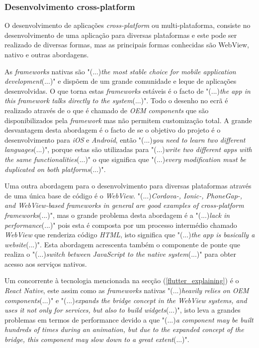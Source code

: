 \subsubsection{Desenvolvimento cross-platform}
O desenvolvimento de aplicações \textit{cross-platform} ou multi-plataforma, consiste no desenvolvimento de uma aplicação para diversas plataformas e este pode ser realizado de diversas formas, mas as principais formas conhecidas são WebView, nativo e outras abordagens.

As \emph{frameworks} nativas são "(...)\emph{the most stable choice for mobile application development}(...)"\citep{flutter} e dispõem de um grande comunidade e leque de aplicações desenvolvidas. O que torna estas \textit{frameworks} estáveis é o facto de "(...)\emph{the app in this framework talks directly to the system}(...)"\citep{flutter}. Todo o desenho no ecrã é realizado através de o que é chamado de \emph{OEM components} que são disponibilizados pela \emph{framework} mas não permitem customização total. A grande desvantagem desta abordagem é o facto de se o objetivo do projeto é o desenvolvimento para \textit{iOS} e \textit{Android}, então "(...)\emph{you need to learn two different languages}(...)"\citep{flutter}, porque estas são utilizadas para "(...)\emph{write two different apps with the same functionalities}(...)"\citep{flutter} o que significa que "(...)\emph{every modification must be duplicated on both platforms}(...)"\citep{flutter}.

Uma outra abordagem para o desenvolvimento para diversas plataformas através de uma única base de código é o \textit{WebView}. "(...)\emph{Cordova-, Ionic-, PhoneGap-, and WebView-based frameworks in general are good examples of cross-platform frameworks}(...)"\citep{flutter}, mas o grande problema desta abordagem é a "(...)\emph{lack in performance}(...)"\citep{flutter} pois esta é composta por um processo intermédio chamado \textit{WebView} que renderiza código \textit{HTML}, isto significa que "(...)\emph{the app is basically a website}(...)"\citep{flutter}.
Esta abordagem acrescenta também o componente de ponte que realiza o "(...)\emph{switch between JavaScript to the native system}(...)"\citep{flutter} para obter acesso aos serviços nativos.

Um concorrente à tecnologia mencionada na secção (\ref{flutter_explaining}) é o \textit{React Native}, este assim como as \textit{frameworks} nativas "(...)\emph{heavily relies on OEM components}(...)"\citep{flutter} e "(...)\emph{expands the bridge concept in the WebView systems, and uses it not only for services, but also to build widgets}(...)"\citep{flutter}, isto leva a grandes problemas em termos de performance devido a que "(...)\emph{a component may be built hundreds of times during an animation, but due to the expanded concept of the bridge, this component may slow down to a great extent}(...)"\citep{flutter}.